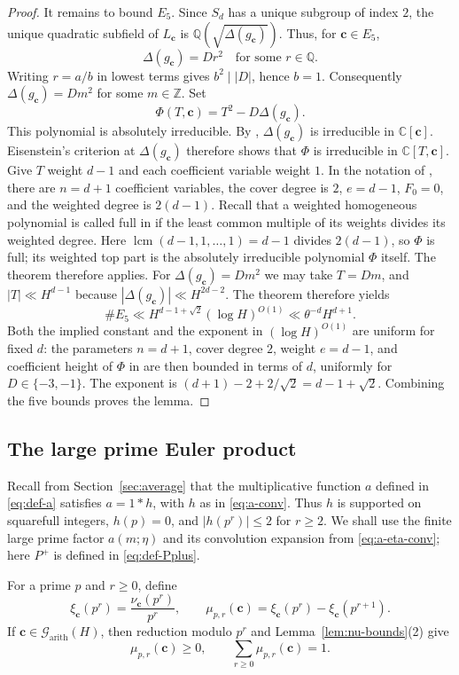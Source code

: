 \documentclass[12pt,reqno]{amsart}
\numberwithin{equation}{section}
\theoremstyle{definition}
\renewcommand{\le}{\leqslant}
\renewcommand{\ge}{\geqslant}
\newcommand{\ZZ}{\mathbb{Z}}
\newcommand{\QQ}{\mathbb{Q}}
\newcommand{\CC}{\mathbb{C}}
\newcommand{\cc}{\mathbf{c}}
\begin{document}
\begin{proof}
It remains to bound $E_5$.
Since $S_d$ has a unique subgroup of index $2$, the unique quadratic subfield of $L_\cc$ is $\QQ(\sqrt{\Delta(g_\cc)})$.
Thus, for $\cc\in E_5$,
\[
\Delta(g_\cc)=Dr^2\quad\text{for some }r\in\QQ.
\]
Writing $r=a/b$ in lowest terms gives $b^2\mid |D|$, hence $b=1$.
Consequently $\Delta(g_\cc)=Dm^2$ for some $m\in\ZZ$.
Set
\[
\Phi(T,\cc)=T^2-D\Delta(g_\cc).
\]
This polynomial is absolutely irreducible.
By \cite[Example~1.4]{GKZ}, $\Delta(g_\cc)$ is irreducible in $\CC[\cc]$.
Eisenstein's criterion at $\Delta(g_\cc)$ therefore shows that $\Phi$ is irreducible in $\CC[T,\cc]$.
Give $T$ weight $d-1$ and each coefficient variable weight $1$.
In the notation of \cite[Theorem~1.2]{BCSSV}, there are $n=d+1$ coefficient variables, the cover degree is $2$, $e=d-1$, $F_0=0$, and the weighted degree is $2(d-1)$.
Recall that a weighted homogeneous polynomial is called full in \cite{BCSSV} if the least common multiple of its weights divides its weighted degree.
Here $\operatorname{lcm}(d-1,1,\ldots,1)=d-1$ divides $2(d-1)$, so $\Phi$ is full; its weighted top part is the absolutely irreducible polynomial $\Phi$ itself.
The theorem therefore applies.
For $\Delta(g_\cc)=Dm^2$ we may take $T=Dm$, and $|T|\ll H^{d-1}$ because $|\Delta(g_\cc)|\ll H^{2d-2}$.
The theorem therefore yields
\[
\#E_5
\ll H^{d-1+\sqrt2}(\log H)^{O(1)}
\ll\theta^{-d}H^{d+1}.
\]
Both the implied constant and the exponent in $(\log H)^{O(1)}$ are uniform for fixed $d$: the parameters $n=d+1$, cover degree $2$, weight $e=d-1$, and coefficient height of $\Phi$ in \cite[Theorem~1.2]{BCSSV} are then bounded in terms of $d$, uniformly for $D\in\{-3,-1\}$.
The exponent is $(d+1)-2+2/\sqrt2=d-1+\sqrt2$.
Combining the five bounds proves the lemma.
\end{proof}

\subsection{The large prime Euler product}

Recall from Section~\ref{sec:average} that the multiplicative function $a$ defined in \eqref{eq:def-a} satisfies $a=1*h$, with $h$ as in \eqref{eq:a-conv}.
Thus $h$ is supported on squarefull integers, $h(p)=0$, and $|h(p^r)|\le2$ for $r\ge2$.
We shall use the finite large prime factor $a(m;\eta)$ and its convolution expansion from \eqref{eq:a-eta-conv}; here $P^+$ is defined in \eqref{eq:def-Pplus}.

For a prime $p$ and $r\ge0$, define
\begin{equation}\label{eq:def-xi}
\xi_\cc(p^r)=\frac{\nu_\cc(p^r)}{p^r},
\qquad
\mu_{p,r}(\cc)=\xi_\cc(p^r)-\xi_\cc(p^{r+1}).
\end{equation}
If $\cc\in\mathcal G_{\mathrm{arith}}(H)$, then reduction modulo $p^r$ and Lemma~\ref{lem:nu-bounds}(2) give
\[
\mu_{p,r}(\cc)\ge0,
\qquad
\sum_{r\ge0}\mu_{p,r}(\cc)=1.
\]
\end{document}
